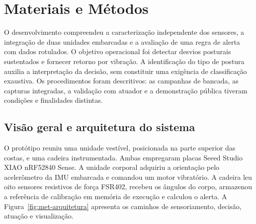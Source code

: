 \section{Materiais e Métodos}
\label{sec:metodologia}

O desenvolvimento compreendeu a caracterização independente dos sensores,
a integração de duas unidades embarcadas e a avaliação de uma regra de
alerta com dados rotulados. O objetivo operacional foi detectar desvios
posturais sustentados e fornecer retorno por vibração. A identificação do
tipo de postura auxilia a interpretação da decisão, sem constituir uma
exigência de classificação exaustiva. Os procedimentos foram descritivos:
as campanhas de bancada, as capturas integradas, a validação com atuador
e a demonstração pública tiveram condições e finalidades distintas.

\subsection{Visão geral e arquitetura do sistema}
\label{sec:met-arquitetura}

O protótipo reuniu uma unidade vestível, posicionada na parte superior das
costas, e uma cadeira instrumentada. Ambas empregaram placas Seeed Studio
XIAO nRF52840 Sense. A unidade corporal adquiriu a orientação pelo
acelerômetro da IMU embarcada e comandou um motor vibratório. A cadeira
leu oito sensores resistivos de força FSR402, recebeu os ângulos do corpo,
armazenou a referência de calibração em memória de execução e calculou o
alerta. A Figura~\ref{fig:met-arquitetura} apresenta os caminhos de
sensoriamento, decisão, atuação e visualização.

